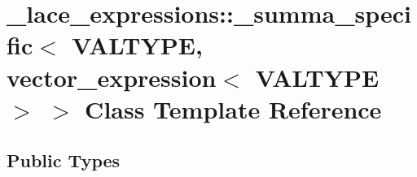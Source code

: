 \hypertarget{class__lace__expressions_1_1__summa__specific_3_01VALTYPE_00_01vector__expression_3_01VALTYPE_01_4_01_4}{\section{\-\_\-lace\-\_\-expressions\-:\-:\-\_\-summa\-\_\-specific$<$ V\-A\-L\-T\-Y\-P\-E, vector\-\_\-expression$<$ V\-A\-L\-T\-Y\-P\-E $>$ $>$ Class Template Reference}
\label{class__lace__expressions_1_1__summa__specific_3_01VALTYPE_00_01vector__expression_3_01VALTYPE_01_4_01_4}
}
\subsection*{Public Types}

